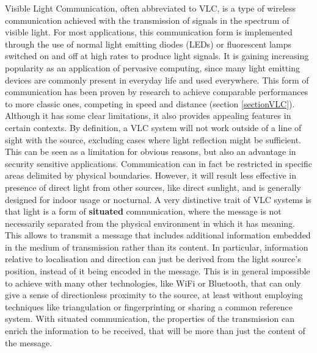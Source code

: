 

Visible Light Communication, often abbreviated to VLC, is a type of wireless communication achieved with the transmission of signals in the spectrum of visible light.
For most applications, this communication form is implemented through the use of  normal light emitting diodes (LEDs) or fluorescent lamps switched on and off at high rates to produce light signals.
It is gaining increasing popularity as an application of pervasive computing, since many light emitting devices are commonly present in everyday life and used everywhere.
This form of communication has been proven by research to achieve comparable performances to more classic ones, competing in speed and distance (section \ref{sectionVLC}).
Although it has some clear limitations, it also provides appealing features in certain contexts.
By definition, a VLC system will not work outside of a line of sight with the source, excluding cases where light reflection might be sufficient.
This can be seen as a limitation for obvious reasons, but also an advantage in security sensitive applications.
Communication can in fact be restricted in specific areas delimited by physical boundaries.
However, it will result less effective in presence of direct light from other sources, like direct sunlight, and is generally designed for indoor usage or nocturnal.
\newline
A very distinctive trait of VLC systems is that light is a form of \textbf{situated} communication, where the message is not necessarily separated from the physical environment in which it has meaning.
This allows to transmit a message that includes additional information embedded in the medium of transmission rather than its content.
In particular, information relative to localisation and direction can just be derived from the light source's position, instead of it being encoded in the message.
This is in general impossible to achieve with many other technologies, like WiFi or Bluetooth, that can only give a sense of directionless proximity to the source, at least without employing techniques like triangulation or fingerprinting or sharing a common reference system.
With situated communication, the properties of the transmission can enrich the information to be received, that will be more than just the content of the message.
